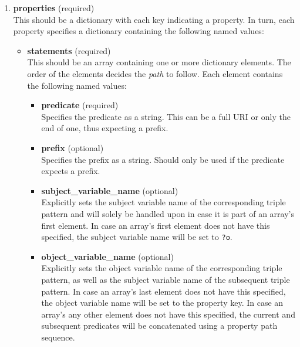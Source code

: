 \begin{enumerate}
    \item \textbf{properties} (required)\\
    This should be a dictionary with each key indicating a property. In turn, each property specifies a dictionary containing the following named values:
    \begin{itemize}
        \item \textbf{statements} (required)\\
        This should be an array containing one or more dictionary elements. The order of the elements decides the \textit{path} to follow. Each element contains the following named values:
        \begin{itemize}
            \item \textbf{predicate} (required)\\
            Specifies the predicate as a string. This can be a full URI or only the end of one, thus expecting a prefix.
                
            \item \textbf{prefix} (optional)\\
            Specifies the prefix as a string. Should only be used if the predicate expects a prefix.
                
            \item \textbf{subject\_variable\_name} (optional)\\
            Explicitly sets the subject variable name of the corresponding triple pattern and will solely be handled upon in case it is part of an array's first element. In case an array's first element does not have this specified, the subject variable name will be set to \texttt{?o}.
                
            \item \textbf{object\_variable\_name} (optional)\\
            Explicitly sets the object variable name of the corresponding triple pattern, as well as the subject variable name of the subsequent triple pattern. In case an array's last element does not have this specified, the object variable name will be set to the property key. In case an array's any other element does not have this specified, the current and subsequent predicates will be concatenated using a property path sequence.

            \end{itemize}
        

\end{itemize}
\end{enumerate}
